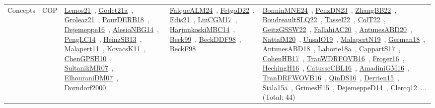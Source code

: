 {\begin{longtable}{lp{3cm}>{\raggedright\arraybackslash}p{6cm}>{\raggedright\arraybackslash}p{6cm}>{\raggedright\arraybackslash}p{8cm}}
\index{COP}\index{Concepts!COP}Concepts & COP & \href{../works/Lemos21.pdf}{Lemos21}~\cite{Lemos21}, \href{../works/Godet21a.pdf}{Godet21a}~\cite{Godet21a}, \href{../works/Groleaz21.pdf}{Groleaz21}~\cite{Groleaz21}, \href{../works/PourDERB18.pdf}{PourDERB18}~\cite{PourDERB18}, \href{../works/Dejemeppe16.pdf}{Dejemeppe16}~\cite{Dejemeppe16}, \href{../works/AlesioNBG14.pdf}{AlesioNBG14}~\cite{AlesioNBG14}, \href{../works/PengLC14.pdf}{PengLC14}~\cite{PengLC14}, \href{../works/HeinzSB13.pdf}{HeinzSB13}~\cite{HeinzSB13}, \href{../works/Malapert11.pdf}{Malapert11}~\cite{Malapert11}, \href{../works/KovacsK11.pdf}{KovacsK11}~\cite{KovacsK11}, \href{../works/ChenGPSH10.pdf}{ChenGPSH10}~\cite{ChenGPSH10}, \href{../works/SultanikMR07.pdf}{SultanikMR07}~\cite{SultanikMR07}, \href{../works/ElhouraniDM07.pdf}{ElhouraniDM07}~\cite{ElhouraniDM07}, \href{../works/Dorndorf2000.pdf}{Dorndorf2000}~\cite{Dorndorf2000} & \href{../works/FalqueALM24.pdf}{FalqueALM24}~\cite{FalqueALM24}, \href{../works/FetgoD22.pdf}{FetgoD22}~\cite{FetgoD22}, \href{../works/Edis21.pdf}{Edis21}~\cite{Edis21}, \href{../works/LiuCGM17.pdf}{LiuCGM17}~\cite{LiuCGM17}, \href{../works/HarjunkoskiMBC14.pdf}{HarjunkoskiMBC14}~\cite{HarjunkoskiMBC14}, \href{../works/Beck99.pdf}{Beck99}~\cite{Beck99}, \href{../works/BeckDDF98.pdf}{BeckDDF98}~\cite{BeckDDF98}, \href{../works/BeckF98.pdf}{BeckF98}~\cite{BeckF98} & \href{../works/BonninMNE24.pdf}{BonninMNE24}~\cite{BonninMNE24}, \href{../works/PenzDN23.pdf}{PenzDN23}~\cite{PenzDN23}, \href{../works/ZhangBB22.pdf}{ZhangBB22}~\cite{ZhangBB22}, \href{../works/BoudreaultSLQ22.pdf}{BoudreaultSLQ22}~\cite{BoudreaultSLQ22}, \href{../works/Tassel22.pdf}{Tassel22}~\cite{Tassel22}, \href{../works/ColT22.pdf}{ColT22}~\cite{ColT22}, \href{../works/GeitzGSSW22.pdf}{GeitzGSSW22}~\cite{GeitzGSSW22}, \href{../works/FallahiAC20.pdf}{FallahiAC20}~\cite{FallahiAC20}, \href{../works/AntunesABD20.pdf}{AntunesABD20}~\cite{AntunesABD20}, \href{../works/NattafM20.pdf}{NattafM20}~\cite{NattafM20}, \href{../works/UnsalO19.pdf}{UnsalO19}~\cite{UnsalO19}, \href{../works/MalapertN19.pdf}{MalapertN19}~\cite{MalapertN19}, \href{../works/German18.pdf}{German18}~\cite{German18}, \href{../works/AntunesABD18.pdf}{AntunesABD18}~\cite{AntunesABD18}, \href{../works/Laborie18a.pdf}{Laborie18a}~\cite{Laborie18a}, \href{../works/CappartS17.pdf}{CappartS17}~\cite{CappartS17}, \href{../works/CohenHB17.pdf}{CohenHB17}~\cite{CohenHB17}, \href{../works/TranWDRFOVB16.pdf}{TranWDRFOVB16}~\cite{TranWDRFOVB16}, \href{../works/Froger16.pdf}{Froger16}~\cite{Froger16}, \href{../works/HechingH16.pdf}{HechingH16}~\cite{HechingH16}, \href{../works/CatusseCBL16.pdf}{CatusseCBL16}~\cite{CatusseCBL16}, \href{../works/AmadiniGM16.pdf}{AmadiniGM16}~\cite{AmadiniGM16}, \href{../works/TranDRFWOVB16.pdf}{TranDRFWOVB16}~\cite{TranDRFWOVB16}, \href{../works/QinDS16.pdf}{QinDS16}~\cite{QinDS16}, \href{../works/Derrien15.pdf}{Derrien15}~\cite{Derrien15}, \href{../works/Siala15a.pdf}{Siala15a}~\cite{Siala15a}, \href{../works/GrimesH15.pdf}{GrimesH15}~\cite{GrimesH15}, \href{../works/DejemeppeD14.pdf}{DejemeppeD14}~\cite{DejemeppeD14}, \href{../works/Clercq12.pdf}{Clercq12}~\cite{Clercq12}... (Total: 44)\\

\end{longtable}}

